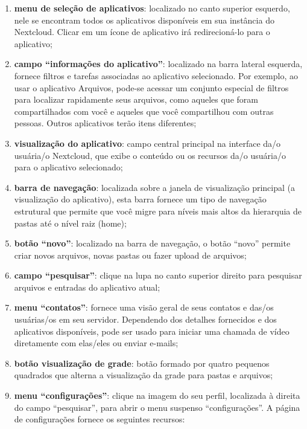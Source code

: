 \documentclass[openright, twoside, a4paper]{memoir}
\begin{document}
\begin{enumerate}

\item
    \textbf{menu de seleção de aplicativos}: localizado no canto superior
    esquerdo, nele se encontram todos os aplicativos disponíveis em sua
    instância do Nextcloud. Clicar em um ícone de aplicativo irá
    redirecioná-lo para o aplicativo;
\item
    \textbf{campo ``informações do aplicativo''}: localizado na barra
    lateral esquerda, fornece filtros e tarefas associadas ao aplicativo
    selecionado. Por exemplo, ao usar o aplicativo Arquivos, pode-se
    acessar um conjunto especial de filtros para localizar rapidamente
    seus arquivos, como aqueles que foram compartilhados com você e
    aqueles que você compartilhou com outras pessoas. Outros aplicativos
    terão itens diferentes;
\item
    \textbf{visualização do aplicativo}: campo central principal na
    interface da/o usuária/o Nextcloud, que exibe o conteúdo ou os
    recursos da/o usuária/o para o aplicativo selecionado;
\item
    \textbf{barra de navegação}: localizada sobre a janela de visualização
    principal (a visualização do aplicativo), esta barra fornece um tipo
    de navegação estrutural que permite que você migre para níveis mais
    altos da hierarquia de pastas até o nível raiz (home);
\item
    \textbf{botão ``novo''}: localizado na barra de navegação, o botão
    ``novo'' permite criar novos arquivos, novas pastas ou fazer upload de
    arquivos;
\item
    \textbf{campo ``pesquisar''}: clique na lupa no canto superior direito
    para pesquisar arquivos e entradas do aplicativo atual;
\item
    \textbf{menu ``contatos''}: fornece uma visão geral de seus contatos e
    das/os usuárias/os em seu servidor. Dependendo dos detalhes fornecidos
    e dos aplicativos disponíveis, pode ser usado para iniciar uma chamada
    de vídeo diretamente com elas/eles ou enviar e-mails;
\item
    \textbf{botão visualização de grade}: botão formado por quatro
    pequenos quadrados que alterna a visualização da grade para pastas e
    arquivos;
\item
    \textbf{menu ``configurações''}: clique na imagem do seu perfil,
    localizada à direita do campo ``pesquisar'', para abrir o menu
    suspenso ``configurações''. A página de configurações fornece os
    seguintes recursos:
\end{enumerate}
\end{document}
